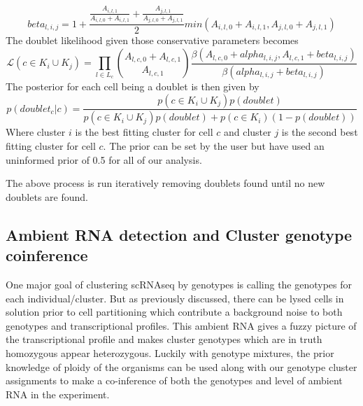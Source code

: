 \begin{equation}
beta_{l,i,j} = 1 + \frac{\frac{A_{i,l,1}}{A_{i,l,0}+A_{i,l,1}} + \frac{A_{j,l,1}}{A_{j,l,0}+A_{j,l,1}}}{2}min(A_{i,l,0}+A_{i,l,1}, A_{j,l,0}+A_{j,l,1})
\end{equation}
The doublet likelihood given those conservative parameters becomes
\begin{equation}
\mathcal{L}(c \in K_i \cup K_j) = \prod_{l \in L_c}  {A_{l,c,0} + A_{l,c,1}  \choose A_{l,c,1}}\frac{\beta(A_{l,c,0} + alpha_{l,i,j}, A_{l,c,1} + beta_{l,i,j})}{\beta(alpha_{l,i,j} + beta_{l,i,j})}
\end{equation}
The posterior for each cell being a doublet is then given by
\begin{equation}
p(doublet_c | c) = \frac{p(c \in K_i \cup K_j)p(doublet)}{p(c \in K_i \cup K_j)p(doublet) + p(c \in K_i)(1-p(doublet))}
\end{equation}
Where cluster $i$ is the best fitting cluster for cell $c$ and cluster $j$ is the second best fitting cluster for cell $c$. The prior can be set by the user but have used an uninformed prior of 0.5 for all of our analysis. 
\par{The above process is run iteratively removing doublets found until no new doublets are found.} 





\subsection{Ambient RNA detection and Cluster genotype coinference}
\par{One major goal of clustering scRNAseq by genotypes is calling the genotypes for each individual/cluster.
But as previously discussed, there can be lysed cells in solution prior to cell partitioning which contribute a background noise to both genotypes and transcriptional profiles. 
This ambient RNA gives a fuzzy picture of the transcriptional profile and makes cluster genotypes which are in truth homozygous appear heterozygous. 
Luckily with genotype mixtures, the prior knowledge of ploidy of the organisms can be used along with our genotype cluster assignments to 
make a co-inference of both the genotypes and level of ambient RNA in the experiment.}

